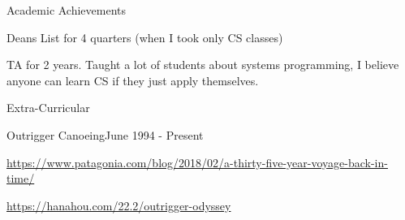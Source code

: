 \documentclass{resume} %
\begin{document}

\begin{rSection}{Academic Achievements} \itemsep -2pt
\item Deans List for 4 quarters (when I took only CS classes)
\item TA for 2 years. Taught a lot of students about systems programming, I believe anyone can learn CS if they just apply themselves.
\end{rSection}

\begin{rSection}{Extra-Curricular}
\begin{rSubsection} {Outrigger Canoeing}{June 1994 - Present}{}{}
\item \href{https://www.patagonia.com/blog/2018/02/a-thirty-five-year-voyage-back-in-time/}{https://www.patagonia.com/blog/2018/02/a-thirty-five-year-voyage-back-in-time/}
\item \href{https://hanahou.com/22.2/outrigger-odyssey}{https://hanahou.com/22.2/outrigger-odyssey}
\end{rSubsection}
\end{rSection}
\end{document}
